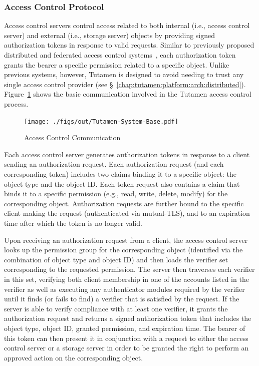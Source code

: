 \subsubsection{Access Control Protocol}
\label{chap:tutamen:platform:arch:acp}

Access control servers control access related to both internal (i.e.,
access control server) and external (i.e., storage server) objects by
providing signed authorization tokens in response to valid
requests. Similar to previously proposed distributed and federated
access control systems~\cite{Calero2010, Leandro2012}, each
authorization token grants the bearer a specific permission related to
a specific object. Unlike previous systems, however, Tutamen is
designed to avoid needing to trust any single access control provider
(see \S~\ref{chap:tutamen:platform:arch:distributed}).
Figure~\ref{fig:tutamen:systembase} shows the basic communication
involved in the Tutamen access control process.

\begin{figure}[t]
  \centering
  \texttt{[image: ./figs/out/Tutamen-System-Base.pdf]}
  \caption{Access Control Communication}
  \label{fig:tutamen:systembase}
\end{figure}

Each access control server generates authorization tokens in response
to a client sending an authorization request. Each authorization
request (and each corresponding token) includes two claims binding it
to a specific object: the object type and the object ID. Each token
request also contains a claim that binds it to a specific permission
(e.g., read, write, delete, modify) for the corresponding
object. Authorization requests are further bound to the specific
client making the request (authenticated via mutual-TLS), and to an
expiration time after which the token is no longer valid.

Upon receiving an authorization request from a client, the access
control server looks up the permission group for the corresponding
object (identified via the combination of object type and object ID)
and then loads the verifier set corresponding to the requested
permission. The server then traverses each verifier in this set,
verifying both client membership in one of the accounts listed in the
verifier as well as executing any authenticator modules required by
the verifier until it finds (or fails to find) a verifier that is
satisfied by the request. If the server is able to verify compliance
with at least one verifier, it grants the authorization request and
returns a signed authorization token that includes the object type,
object ID, granted permission, and expiration time. The bearer of this
token can then present it in conjunction with a request to either the
access control server or a storage server in order to be granted the
right to perform an approved action on the corresponding object.

